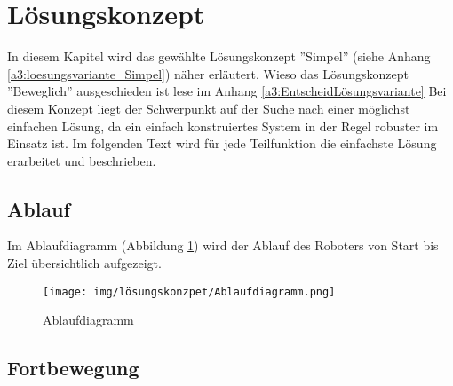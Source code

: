 \documentclass[../main.tex]{subfiles}
\begin{document}
\newpage
\section{Lösungskonzept}

In diesem Kapitel wird das gewählte Lösungskonzept ''Simpel'' (siehe Anhang \ref{a3:loesungsvariante_Simpel}) näher erläutert. Wieso das Lösungskonzept ''Beweglich'' ausgeschieden ist lese im Anhang \ref{a3:EntscheidLösungsvariante} Bei diesem Konzept liegt der Schwerpunkt auf der Suche nach einer möglichst einfachen Lösung, da ein einfach konstruiertes System in der Regel robuster im Einsatz ist. Im folgenden Text wird für jede Teilfunktion die einfachste Lösung erarbeitet und beschrieben.

\subsection{Ablauf}

Im Ablaufdiagramm (Abbildung \ref{img:ablaufdiagramm}) wird der Ablauf des Roboters von Start bis Ziel übersichtlich aufgezeigt.

\begin{figure}[H]
\texttt{[image: img/lösungskonzpet/Ablaufdiagramm.png]}
\caption{Ablaufdiagramm}
\label{img:ablaufdiagramm}
\end{figure}

\subsection{Fortbewegung}
\end{document}
